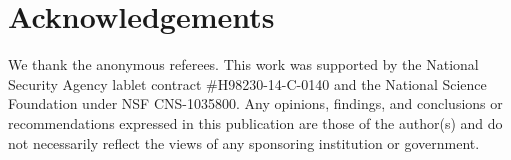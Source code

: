 \documentclass[10pt]{sigplanconf}
\theoremstyle{definition}
\begin{document}
\section*{Acknowledgements}
We thank the anonymous referees.
This work was supported by the National Security Agency
lablet contract \#H98230-14-C-0140 and the National Science Foundation under NSF CNS-1035800.
Any opinions, findings, and conclusions or recommendations expressed in this publication are those of the author(s) and do not necessarily reflect the views of any sponsoring institution or government.
\vspace{5px}
\end{document}
